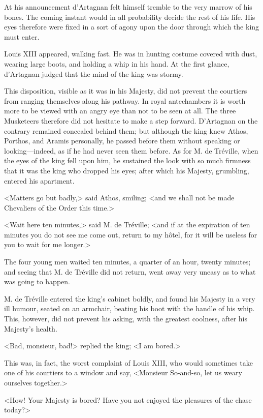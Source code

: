 At his announcement d'Artagnan felt himself tremble to the very marrow of his bones. The coming instant would in all probability decide the rest of his life. His eyes therefore were fixed in a sort of agony upon the door through which the king must enter. 

Louis XIII appeared, walking fast. He was in hunting costume covered with dust, wearing large boots, and holding a whip in his hand. At the first glance, d'Artagnan judged that the mind of the king was stormy. 

This disposition, visible as it was in his Majesty, did not prevent the courtiers from ranging themselves along his pathway. In royal antechambers it is worth more to be viewed with an angry eye than not to be seen at all. The three Musketeers therefore did not hesitate to make a step forward. D'Artagnan on the contrary remained concealed behind them; but although the king knew Athos, Porthos, and Aramis personally, he passed before them without speaking or looking---indeed, as if he had never seen them before. As for M. de Tréville, when the eyes of the king fell upon him, he sustained the look with so much firmness that it was the king who dropped his eyes; after which his Majesty, grumbling, entered his apartment. 

<Matters go but badly,> said Athos, smiling; <and we shall not be made Chevaliers of the Order this time.> 

<Wait here ten minutes,> said M. de Tréville; <and if at the expiration of ten minutes you do not see me come out, return to my hôtel, for it will be useless for you to wait for me longer.> 

The four young men waited ten minutes, a quarter of an hour, twenty minutes; and seeing that M. de Tréville did not return, went away very uneasy as to what was going to happen. 

M. de Tréville entered the king's cabinet boldly, and found his Majesty in a very ill humour, seated on an armchair, beating his boot with the handle of his whip. This, however, did not prevent his asking, with the greatest coolness, after his Majesty's health. 

<Bad, monsieur, bad!> replied the king; <I am bored.> 

This was, in fact, the worst complaint of Louis XIII, who would sometimes take one of his courtiers to a window and say, <Monsieur So-and-so, let us weary ourselves together.> 

<How! Your Majesty is bored? Have you not enjoyed the pleasures of the chase today?> 

